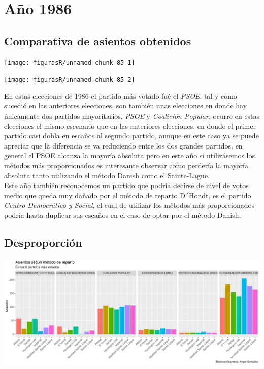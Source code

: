 \documentclass[12pt,a4paper,]{book}
\numberwithin{dummy}{section}
\theoremstyle{ocrenumbox}
\theoremstyle{blacknumex}
\theoremstyle{blacknumbox}
\theoremstyle{ocrenum}
\theoremstyle{ocrenum}
\begin{document}
\hypertarget{auxf1o-1986}{%
\section{Año 1986}\label{auxf1o-1986}}

\hypertarget{comparativa-de-asientos-obtenidos-3}{%
\subsection{Comparativa de asientos
obtenidos}\label{comparativa-de-asientos-obtenidos-3}}

\begin{center}\texttt{[image: figurasR/unnamed-chunk-85-1]} \end{center}

\begin{center}\texttt{[image: figurasR/unnamed-chunk-85-2]} \end{center}

En estas elecciones de 1986 el partido más votado fué el \emph{PSOE},
tal y como sucedió en las anteriores elecciones, son también unas
elecciones en donde hay únicamente dos partidos mayoritarios,
\emph{PSOE} y \emph{Coalición Popular}, ocurre en estas elecciones el
mismo escenario que en las anteriores elecciones, en donde el primer
partido casi dobla en escaños al segundo partido, aunque en este caso ya
se puede apreciar que la diferencia se va reduciendo entre los dos
grandes partidos, en general el PSOE alcanza la mayoría absoluta pero en
este año si utilizásemos los métodos más proporcionados es interesante
observar como perdería la mayoría absoluta tanto utilizando el método
Danish como el Sainte-Lague.\\
Este año también reconocemos un partido que podría decirse de nivel de
votos medio que queda muy dañado por el método de reparto D´Hondt, es el
partido \emph{Centro Democrático y Social}, el cual de utilizar los
métodos más proporcionados podría hasta duplicar sus escaños en el caso
de optar por el método Danish.

\hypertarget{desproporciuxf3n-3}{%
\subsection{Desproporción}\label{desproporciuxf3n-3}}

\begin{center}\includegraphics[width=1\linewidth]{figurasR/unnamed-chunk-86-1} \end{center}
\end{document}

